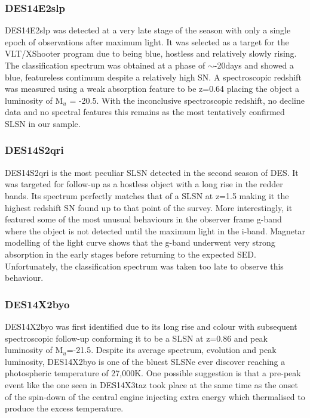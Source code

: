 \subsubsection{DES14E2slp}
DES14E2slp was detected at a very late stage of the season with only a single epoch of observations after maximum light. It was selected as a target for the VLT/XShooter program due to being blue, hostless and relatively slowly rising. The classification spectrum was obtained at a phase of $\sim$-20days and showed a blue, featureless continuum despite a relatively high S\/N. A spectroscopic redshift was measured using a weak absorption feature to be z=0.64 placing the object a luminosity of M$_u$ = -20.5. With the inconclusive spectroscopic redshift, no decline data and no spectral features this remains as the most tentatively confirmed SLSN in our sample.

\subsubsection{DES14S2qri}
DES14S2qri is the most peculiar SLSN detected in the second season of DES. It was targeted for follow-up as a hostless object with a long rise in the redder bands. Its spectrum perfectly matches that of a SLSN at z=1.5 making it the highest redshift SN found up to that point of the survey. More interestingly, it featured some of the most unusual behaviours in the observer frame g-band where the object is not detected until the maximum light in the i-band. Magnetar modelling of the light curve shows that the g-band underwent very strong absorption in the early stages before returning to the expected SED. Unfortunately, the classification spectrum was taken too late to observe this behaviour.

\subsubsection{DES14X2byo}
DES14X2byo was first identified due to its long rise and colour with subsequent spectroscopic follow-up conforming it to be a SLSN at z=0.86 and peak luminosity of M$_u$=-21.5. Despite its average spectrum, evolution and peak luminosity, DES14X2byo is one of the bluest SLSNe ever discover reaching a photospheric temperature of 27,000K. One possible suggestion is that a pre-peak event like the one seen in DES14X3taz took place at the same time as the onset of the spin-down of the central engine injecting extra energy which thermalised to produce the excess temperature.

